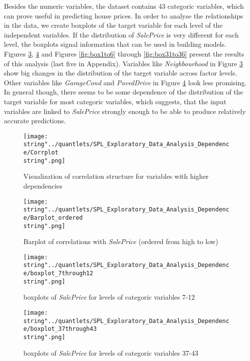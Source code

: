 Besides the numeric variables, the dataset contains 43 categoric variables, which can prove useful in predicting house prices. In order to analyse the relationships in the data, we create boxplots of the target variable for each level of the independent variables. If the distribution of \textit{SalePrice} is very different for each level, the boxplots signal information that can be used in building models. Figures \ref{fig:box7to12}, \ref{fig:box37to43} and Figures  \ref{fig:box1to6} through \ref{fig:box31to36} present the results of this analysis (last five in Appendix). Variables like \textit{Neighbourhood} in Figure \ref{fig:box7to12} show big changes in the distribution of the target variable across factor levels. Other variables like \textit{GarageCond} and \textit{PavedDrive} in Figure \ref{fig:box37to43} look less promising. In general though, there seems to be some dependence of the distribution of the target variable for most categoric variables, which suggests, that the input variables are  linked to \textit{SalePrice} strongly enough to be able to produce relatively accurate predictions. 
\begin{figure}[H]
  \centering
\texttt{[image: \\string"../quantlets/SPL\_Exploratory\_Data\_Analysis\_Dependence/Corrplot\\string".png]}
  \caption{Visualization of correlation structure for variables with higher dependencies}\label{fig:corrgram}
\end{figure}

\begin{figure}[H]
  \centering
\texttt{[image: \\string"../quantlets/SPL\_Exploratory\_Data\_Analysis\_Dependence/Barplot\_ordered\\string".png]}
  \caption{Barplot of correlations with \textit{SalePrice} (ordered from high to low)}\label{fig:barplot_ordered}
\end{figure}

\begin{figure}[H]
\centering
\texttt{[image: \\string"../quantlets/SPL\_Exploratory\_Data\_Analysis\_Dependence/boxplot\_7through12\\string".png]}
\caption{boxplots of \textit{SalePrice} for levels of categoric variables 7-12}
\label{fig:box7to12}
\end{figure}

\begin{figure}[H]
\centering
	\texttt{[image: \\string"../quantlets/SPL\_Exploratory\_Data\_Analysis\_Dependence/boxplot\_37through43\\string".png]}
  	\caption{boxplots of \textit{SalePrice} for levels of categoric variables 37-43}
  	\label{fig:box37to43}
\end{figure}




